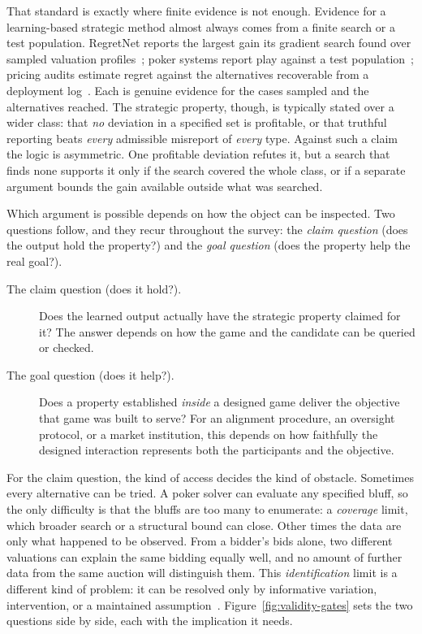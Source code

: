 That standard is exactly where finite evidence is not enough. Evidence for a
learning-based strategic method almost always comes from a finite search or a
test population. RegretNet reports the largest gain its gradient search found
over sampled valuation profiles~\citep{Duetting2019}; poker systems report play
against a test population~\citep{Moravcik2017,BrownSandholm2018,BrownReBeL2020};
pricing audits estimate regret against the alternatives recoverable from a
deployment log~\citep{HartlineLongZhang2024}. Each is genuine evidence for the cases sampled and the alternatives reached. The strategic property, though,
is typically stated over a wider class: that \emph{no} deviation in a specified
set is profitable, or that truthful reporting beats \emph{every} admissible
misreport of \emph{every} type. Against such a claim the logic is asymmetric. One
profitable deviation refutes it, but a search that finds none supports it only if the search covered the whole class, or if a separate argument bounds
the gain available outside what was searched.

Which argument is possible depends on how the object can be inspected. Two
questions follow, and they recur throughout the survey: the \emph{claim
question} (does the output hold the property?) and the \emph{goal question}
(does the property help the real goal?).

\begin{description}
\item[The claim question (does it hold?).] Does the learned output actually have the strategic property claimed for it? The answer depends on how the game and the candidate can be queried or checked.

\item[The goal question (does it help?).] Does a property established \emph{inside} a designed game deliver the objective that game was built to serve?
For an alignment procedure, an oversight protocol, or a market institution, this
depends on how faithfully the designed interaction represents both the participants
and the objective.
\end{description}

For the claim question, the kind of access decides the kind of obstacle. Sometimes every
alternative can be tried. A poker solver can evaluate any specified bluff, so the only
difficulty is that the bluffs are too many to enumerate: a \emph{coverage} limit, which broader
search or a structural bound can close. Other times the data are only
what happened to be observed. From a bidder's bids alone, two different valuations
can explain the same bidding equally well, and no amount of further data from the
same auction will distinguish them. This \emph{identification} limit is a different kind of problem: it can be resolved only by informative variation, intervention, or a maintained
assumption~\citep{HaileHortacsuKosenok2008}.
Figure~\ref{fig:validity-gates} sets the two questions side by side,
each with the implication it needs.

